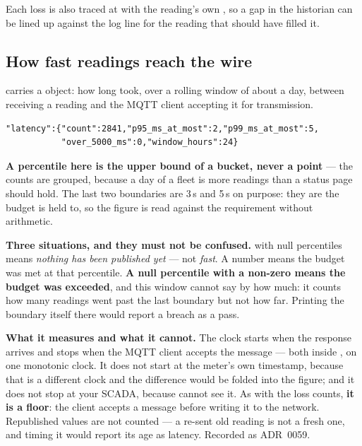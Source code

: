 Each loss is also traced at  with the reading's own , so a gap in
the historian can be lined up against the log line for the reading that should have filled
it.

\subsection{How fast readings reach the wire}

 carries a  object: how long \prog took, over a rolling window of
about a day, between receiving a reading and the MQTT client accepting it for transmission.

\begin{verbatim}
"latency":{"count":2841,"p95_ms_at_most":2,"p99_ms_at_most":5,
           "over_5000_ms":0,"window_hours":24}
\end{verbatim}

\textbf{A percentile here is the upper bound of a bucket, never a point} --- the counts are grouped,
because a day of a fleet is more readings than a status page should hold. The last two boundaries
are 3\,s and 5\,s on purpose: they are the budget \prog is held to, so the figure is read against
the requirement without arithmetic.

\begin{warning}
\textbf{Three situations, and they must not be confused.}  with null percentiles means
\emph{nothing has been published yet} --- not \emph{fast}. A number means the budget was met at that
percentile. \textbf{A null percentile with a non-zero  means the budget was
exceeded}, and this window cannot say by how much: it counts how many readings went past the last
boundary but not how far. Printing the boundary itself there would report a breach as a pass.
\end{warning}

\textbf{What it measures and what it cannot.} The clock starts when the response arrives and stops
when the MQTT client accepts the message --- both inside \prog, on one monotonic clock. It does not
start at the meter's own timestamp, because that is a different clock and the difference would be
folded into the figure; and it does not stop at your SCADA, because \prog cannot see it. As with the
loss counts, \textbf{it is a floor}: the client accepts a message before writing it to the network.
Republished values are not counted --- a re-sent old reading is not a fresh one, and timing it would
report its age as latency. Recorded as ADR~0059.

